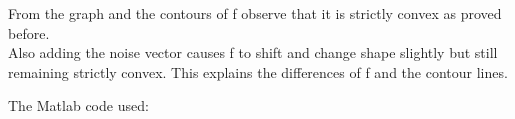 \documentclass[12pt]{article}
\begin{document}
\begin{enumerate}
\begin{enumerate}
From the graph and the contours of f observe that it is strictly convex as proved before.\\
Also adding the noise vector causes f to shift and change shape slightly but still remaining strictly convex. This explains the differences of f and the contour lines.

\end{enumerate}

\end{enumerate}
\newpage
The Matlab code used:
\lstset{style=myCustomMatlabStyle}

\end{document}
